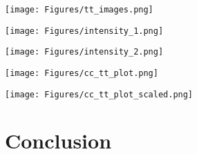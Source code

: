 \documentclass[preprint2]{aastex}
\begin{document}
\begin{figure*}[htb!]
    \texttt{[image: Figures/tt\_images.png]}
    \caption{Timelag corresponding to the cross-correlation values higher than 0.5.}
    \label{tt}
\end{figure*}

\begin{figure*}[htb!]
    \texttt{[image: Figures/intensity\_1.png]}
    \caption{Intensity of each pixel is plotted as a function of radius for each
        passband.}
    \label{intensity_1}
\end{figure*}

\begin{figure*}[htb!]
    \texttt{[image: Figures/intensity\_2.png]}
    \caption{Same as figure \ref{intensity_1}, but with half the radius range
        cut off to better view the values around the main BP.}
    \label{intensity_2}
\end{figure*}

\begin{figure*}[htb!]
    \texttt{[image: Figures/cc\_tt\_plot.png]}
    \caption{The highest cross-correlation value of each pixel is plotted as a function
        of its distance from the center pixel. The color indicates the timelag
        corresponding to the maximum cross-correlation for that pixel.}
    \label{tt_all_plot}
\end{figure*}

\begin{figure*}[htb!]
    \texttt{[image: Figures/cc\_tt\_plot\_scaled.png]}
    \caption{Same as figure \ref{tt_all_plot}, but with two thirds of the timelag cut out
        at both ends.}
    \label{tt_plot}
\end{figure*}


\section{Conclusion}\label{conclusion}


\end{document}

